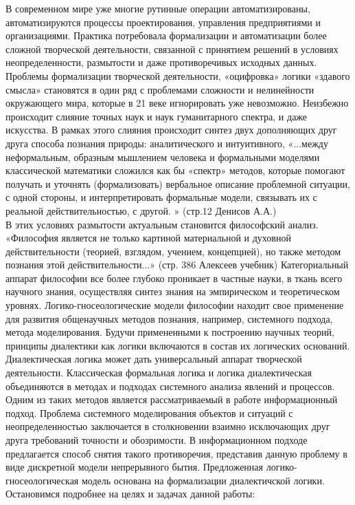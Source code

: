 \documentclass[a4paper,12pt]{report}
\begin{document}
В современном мире уже многие рутинные операции автоматизированы, автоматизируются процессы проектирования, управления предприятиями и организациями. Практика потребовала формализации и автоматизации более сложной творческой деятельности, связанной с принятием решений в условиях неопределенности, размытости и даже противоречивых исходных данных.  Проблемы формализации творческой деятельности, «оцифровка» логики «здавого смысла» становятся в один ряд с проблемами сложности и нелинейности окружающего мира, которые в 21 веке игнорировать уже невозможно. Неизбежно происходит слияние точных наук и наук гуманитарного спектра, и даже искусства. В рамках этого слияния происходит синтез двух дополняющих друг друга способа познания природы: аналитического и интуитивного, «...между неформальным, образным мышлением человека и формальными моделями классической математики сложился как бы «спектр» методов, которые помогают получать и уточнять (формализовать) вербальное описание проблемной ситуации, с одной стороны, и интерпретировать формальные модели, связывать их с реальной действительностью, с другой. » (стр.12 Денисов А.А.) \\

В этих условиях размытости актуальным становится философский анализ. «Философия является не только картиной материальной и духовной действительности (теорией, взглядом, учением, концепцией), но также методом познания этой действительности...»  (стр. 386 Алексеев учебник) Категориальный аппарат философии  все более глубоко проникает в частные науки, в ткань всего научного знания, осуществляя синтез знания на эмпирическом и теоретическом уровнях. Логико-гносеологические модели философии находит свое применение для развития общенаучных методов познания, например, системного подхода, метода моделирования. Будучи примененными к построению научных теорий, принципы диалектики как логики включаются в состав их логических оснований.  Диалектическая логика может дать универсальный аппарат творческой деятельности.
Классическая формальная логика и логика диалектическая объединяются в методах и подходах системного анализа явлений и процессов.\\
 Одним из таких методов является рассматриваемый в работе информационный подход. Проблема системного моделирования объектов и ситуаций с неопределенностью заключается в столкновении взаимно исключающих друг друга требований точности и обозримости. В информационном подходе предлагается способ снятия такого противоречия, представив данную проблему в виде дискретной модели непрерывного бытия. Предложенная логико-гносеологическая модель основана на формализации диалектичской логики. Остановимся подробнее на целях и задачах данной работы:\\
\end{document}
